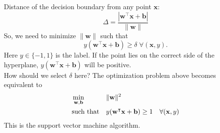 \documentclass[10pt]{article}
\begin{document}
\newpage
Distance of the decision boundary from any point $\mathbf{x}$:
\begin{equation*}
\Delta = \frac{|\mathbf{w}^\intercal \mathbf{x} + \mathbf{b}|}{\|\mathbf{w}\|}  
\end{equation*}
So, we need to minimize $\|\mathbf{w}\|$ such that 
\begin{equation*}
y(\mathbf{w}^\intercal \mathbf{x} + \mathbf{b}) \ge \delta \; \forall (\mathbf{x}, y).
\end{equation*}
Here $y \in \{-1, 1\}$ is the label. If the point lies on the correct side of the hyperplane, $y(\mathbf{w}^\intercal \mathbf{x} + \mathbf{b})$ will be positive.\\
How should we select $\delta$ here?
The optimization problem above becomes equivalent to\\
\begin{align*}
    & \min_{\mathbf{w}, \mathbf{b}}  &&  \|\mathbf{w}\|^2  && \notag \\
    & \text{such that}     &&  y(\mathbf{w}^\intercal \mathbf{x} + \mathbf{b}) \ge 1 && \forall (\mathbf{x}, y) \notag \\
\end{align*}
This is the support vector machine algorithm.
\end{document}

